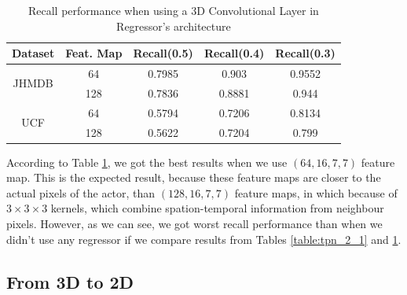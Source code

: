 \begin{table}[h]
  \centering
  \begin{tabular}{||c | c || c  c  c||}
    \hline
    \textbf{Dataset} & \textbf{Feat. Map} & \textbf{Recall(0.5)} & \textbf{Recall(0.4)} & \textbf{Recall(0.3)}\\
    \hline
    \multirow{2}{*}{JHMDB} &  64 & 0.7985 & 0.903 & 0.9552 \\
    \cline{2-5}
    {} & 128 & 0.7836 & 0.8881 & 0.944\\
    \hline
    \multirow{2}{*}{UCF}  & 64 & 0.5794 & 0.7206 & 0.8134 \\
    \cline{2-5}
    {} & 128 & 0.5622 & 0.7204 & 0.799 \\
    \hline

  \end{tabular}
  \caption{Recall performance when using a 3D Convolutional Layer in Regressor's architecture}
  \label{table:reg_2_1}
\end{table}

According to Table \ref{table:reg_2_1}, we got the best results when we use $(64,16,7,7)$ feature map. This is the expected result, because these feature maps
are closer to the actual pixels of the actor, than $(128,16,7,7)$ feature maps, in which because of $3 \times 3 \times 3$ kernels, which combine spation-temporal
information from neighbour pixels. However, as we can see, we got worst recall performance than when we didn't use any regressor if we compare results from Tables
\ref{table:tpn_2_1} and \ref{table:reg_2_1}.

\subsection{From 3D to 2D}

